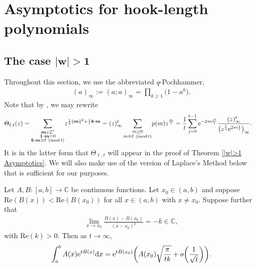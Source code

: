 \section{Asymptotics for hook-length polynomials} \label{S: Asymptotics}

\subsection[The case |w|>1]{The case $\boldsymbol{|w|>1}$} %

Throughout this section, we use the abbreviated $q$-Pochhammer,
\begin{align*}
(a)_{\infty}:=(a;a)_{\infty}=\prod_{k \geq 1} \big(1-a^k\big).
\end{align*}
Note that by \cite[equation~(3.1)]{GKS}, we may rewrite
\begin{align*}
 \Theta_{\ell,t}(z)&{}=\sum_{\substack{\boldsymbol{m}\in \mathbb{Z}^t \\ \boldsymbol{1} \cdot \boldsymbol{m}=0 \\ \boldsymbol{b}\cdot \boldsymbol{m} \equiv \ell \ (\text{mod}\, {t}) }} \! z^{\frac{1}{2}\|\boldsymbol{m}\|^2+\frac{1}{t}\boldsymbol{b}\cdot \boldsymbol{m}}
 = (z)_{\infty}^t \sum_{\substack{m \geq 0 \\ m \equiv \ell \ (\text{mod}\, {t})}}\! p(m)z^{\frac{m}{t}}
=\frac{1}{t}\sum_{j=0}^{ t-1}{\rm e}^{-2\pi {\rm i} \frac{j\ell}{t}}\frac{(z)_{\infty}^t}{\big(z^{\frac{1}{t}}{\rm e}^{2\pi {\rm i} \frac{j}{t}}\big)_{\infty}}.
\end{align*}
It is in the latter form that $\Theta_{\ell,t}$ will appear in the proof of Theorem \ref{|w|>1 Asymptotics}. We will also make use of the version of Laplace's Method below that is sufficient for our purposes.
\begin{Theorem}\label{T:LaplaceMethod}
 Let $A,B\colon [a,b]\to \mathbb{C}$ be continuous functions. Let $x_0 \in (a,b)$ and suppose $\mathrm{Re}(B(x))<\mathrm{Re}(B(x_0))$ for all $x\in (a,b)$ with $x \neq x_0$. Suppose further that
 \begin{align*}
 \lim_{x\to x_0}\frac{B(x)-B(x_0)}{(x-x_0)^2} = -k\in \mathbb{C},
 \end{align*}
 with $\mathrm{Re}(k)>0.$ Then as $t \to \infty$,
 \begin{align*}
 \int^b_{a}A(x){\rm e}^{tB(x)}{\rm d}x = {\rm e}^{tB(x_0)}\biggl(A(x_0)\sqrt{\frac{\pi}{tk}}+o\biggl(\frac{1}{\sqrt{t}}\biggr)\biggr).
 \end{align*}
\end{Theorem}

